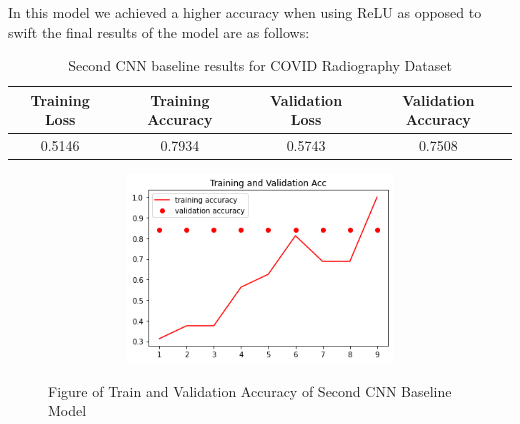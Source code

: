     \begin{table}[H]
    \centering
    \caption{Second CNN baseline model hyperparameters for COVID Radiography Dataset }
    \label{tab:Second CNN baseline model hyperparameters for COVID Radiography Dataset}
\end{table}
In this model we achieved a higher accuracy when using ReLU as opposed to swift the final results of the model are as follows:
\begin{table}[H]
    \centering
    \begin{tabular}{|c|c|c|c|}
    \hline
         Training Loss
         & Training Accuracy 
         & Validation Loss
         & Validation Accuracy\\
         \hline
         0.5146  & 0.7934 & 0.5743  & 0.7508\\
         \hline
    \end{tabular}
    \caption{Second CNN baseline results for COVID Radiography Dataset}
    \label{tab:Second CNN baseline results for COVID Radiography Dataset}
\end{table}
 \begin{figure}[H]
    \centering
    \includegraphics[width=1\textwidth,height=5cm,keepaspectratio]{Images/SecondCNNBaselineTrainAndValAcc.PNG}\\
    \caption{Figure of Train and Validation Accuracy of Second CNN Baseline Model}
    \label{fig:Second CNN Baseline Train and Validation Accuracy}
\end{figure}
